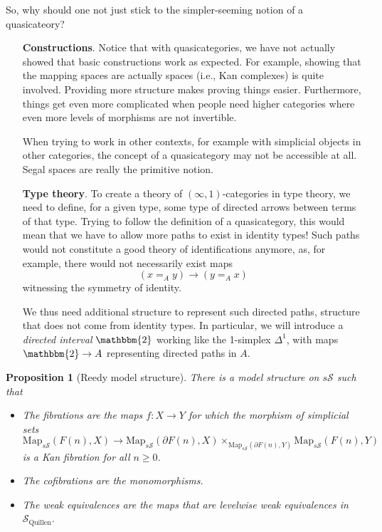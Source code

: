 \documentclass{article}
\newcommand{\cS}{\mathcal{S}}
\newcommand{\sS}{s\cS}
\newcommand{\Map}{\mathrm{Map}}
\newtheorem{prop}[subsection]{Proposition}
\theoremstyle{definition}
\begin{document}
So, why should one not just stick to the simpler-seeming notion of a quasicateory?

\begin{itemize}
    \item[\textbf{Constructions}.] Notice that with quasicategories, we have not actually showed that basic constructions work as expected. For example, showing that the mapping spaces are actually spaces (i.e., Kan complexes) is quite involved. Providing more structure makes proving things easier. Furthermore, things get even more complicated when people need higher categories where even more levels of morphisms are not invertible. \par
    When trying to work in other contexts, for example with simplicial objects in other categories, the concept of a quasicategory may not be accessible at all.  Segal spaces are really the primitive notion.
    \item[\textbf{Type theory}.] To create a theory of $(\infty,1)$-categories in type theory, we need to define, for a given type, some type of directed arrows between terms of that type. Trying to follow the definition of a quasicategory, this would mean that we have to allow more paths to exist in identity types! Such paths would not constitute a good theory of identifications anymore, as, for example, there would not necessarily exist maps $$(x=_Ay)\to (y=_Ax)$$ witnessing the symmetry of identity. 
    \par We thus need additional structure to represent such directed paths, structure that does not come from identity types. In particular, we will introduce a \textit{directed interval} $\mathbbm{2}$ working like the 1-simplex $\Delta^1$, with maps $\mathbbm{2}\to A$ representing directed paths in $A$. 
\end{itemize}

\begin{prop}[Reedy model structure]
    There is a model structure on $\sS$ such that
    \begin{itemize}
        \item The fibrations are the maps $f:X\to Y$ for which the morphism of simplicial sets $$\Map_{\sS}(F(n),X)\to \Map_{\sS}(\partial F(n), X)\times_{\Map_{\sS}(\partial F(n),Y)}\Map_{\sS}(F(n),Y)$$ is a Kan fibration for all $n\geq 0$. 
        \item The cofibrations are the monomorphisms.
        \item The weak equivalences are the maps that are levelwise weak equivalences in $\cS_{\text{Quillen}}$.
    \end{itemize}
\end{prop}
\end{document}
